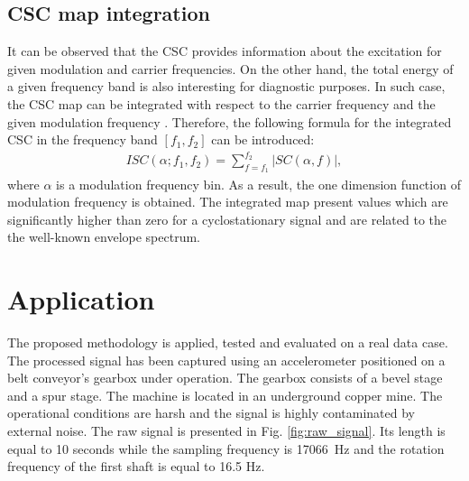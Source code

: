 \documentclass[11pt]{article}
\begin{document}
\subsection{CSC map integration}
It can be observed that the CSC provides information about the excitation for given modulation and carrier frequencies. On the other hand, the total energy of a given frequency band is also interesting for diagnostic purposes. In such case,  the CSC map can be integrated with respect to the carrier frequency and the given modulation frequency \cite{randall2001relationship}. Therefore, the following formula for the integrated  CSC in the frequency band $[f_1,f_2]$ can be introduced:
\begin{align}
 ISC(\alpha;f_1,f_2)=\sum_{f=f_1}^{f_2}\left|SC(\alpha,f)\right|,
\end{align}
where $\alpha$ is a modulation frequency bin. As a result, the one dimension function of modulation frequency is obtained. The integrated map present values which are significantly higher than zero for a cyclostationary signal and are related to the the well-known envelope spectrum.

\section{Application}
\label{sec:application}
The proposed methodology is applied, tested and evaluated on a real data case. The processed signal has been captured using an accelerometer positioned on a belt conveyor's gearbox under operation. The gearbox consists of a bevel stage and a spur stage. The machine is located in an underground copper mine. The operational conditions are harsh and the signal is highly contaminated by external noise. The raw signal is presented in Fig. \ref{fig:raw_signal}. Its length is equal to 10 seconds while the sampling frequency is 17066~Hz and the rotation frequency of the first shaft is equal to 16.5 Hz.
\end{document}
